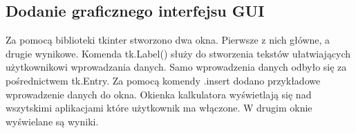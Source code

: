 \subsection{Dodanie graficznego interfejsu GUI}
Za pomocą biblioteki tkinter  stworzono dwa okna. Pierwsze z nich główne, a drugie wynikowe. Komenda tk.Label() służy do stworzenia tekstów ułatwiających użytkownikowi wprowadzania danych. Samo wprowadzenia danych odbyło się za pośrednictwem tk.Entry. Za pomocą komendy .insert dodano przykładowe wprowadzenie danych do okna. Okienka kalkulatora wyświetlają się nad wszytskimi aplikacjami które użytkownik ma włączone. W drugim oknie wyświelane są wyniki.
